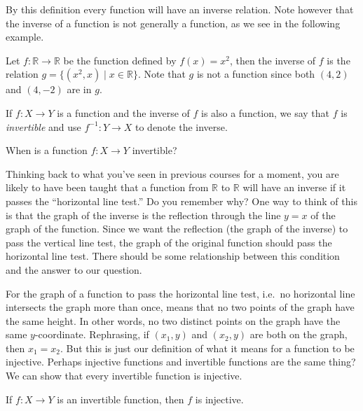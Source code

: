 By this definition every function will have an inverse relation. Note however that the inverse of a function is not generally a function, as we see in the following example.

\begin{example}
Let $f:\mathbb R\to\mathbb R$ be the function defined by $f(x)=x^2$, then the inverse of $f$ is the relation $g=\{ (x^2,x)\mid x\in\mathbb R\}$.  Note that $g$ is not a function since both $(4,2)$ and $(4,-2)$ are in $g$.
\end{example}

\begin{definition}
If $f:X\to Y$ is a function and the inverse of $f$ is also a function, we say that $f$ is \emph{invertible} and use $f^{-1}:Y\to X$ to denote the inverse.
\end{definition}


\begin{question}
When is a function $f:X\to Y$ invertible?
\end{question}

Thinking back to what you've seen in previous courses for a moment, you are likely to have been taught that a function from $\mathbb R$ to $\mathbb R$ will have an inverse if it passes the ``horizontal line test.''   Do you remember why?  One way to think of this is that the graph of the inverse is the reflection through the line $y=x$ of the graph of the function.  Since we want the reflection (the graph of the inverse) to pass the vertical line test, the graph of the original function should pass the horizontal line test.  There should be some relationship between this condition and the answer to our question.

For the graph of a function to pass the horizontal line test, i.e.~no horizontal line intersects the graph more than once, means that no two points of the graph have the same height.  In other words, no two distinct points on the graph have the same $y$-coordinate.  Rephrasing, if $(x_1,y)$ and $(x_2,y)$ are both on the graph, then $x_1=x_2$.  But this is just our definition of what it means for a function to be injective.  Perhaps injective functions and invertible functions are the same thing?  We can show that every invertible function is injective.

\begin{thrm}\label{th:inject}
If $f:X\to Y$ is an invertible function, then $f$ is injective.
\end{thrm}


